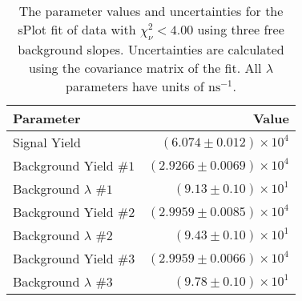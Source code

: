 
\begin{table}[ht]
    \begin{center}
        \begin{tabular}{lr}\toprule
            Parameter & Value \\\midrule
            Signal Yield & $(6.074 \pm 0.012) \times 10^{4}$ \\
            Background Yield $\#1$ & $(2.9266 \pm 0.0069) \times 10^{4}$ \\
            Background $\lambda$ $\#1$ & $(9.13 \pm 0.10) \times 10^{1}$ \\
            Background Yield $\#2$ & $(2.9959 \pm 0.0085) \times 10^{4}$ \\
            Background $\lambda$ $\#2$ & $(9.43 \pm 0.10) \times 10^{1}$ \\
            Background Yield $\#3$ & $(2.9959 \pm 0.0066) \times 10^{4}$ \\
            Background $\lambda$ $\#3$ & $(9.78 \pm 0.10) \times 10^{1}$ \\\bottomrule
        \end{tabular}
        \caption{The parameter values and uncertainties for the sPlot fit of data with $\chi^2_\nu < 4.00$ using three free background slopes. Uncertainties are calculated using the covariance matrix of the fit. All $\lambda$ parameters have units of $\si{\nano\second}^{-1}$.}\label{tab:splot-fit-results-chisqdof-4.00-free-3}
    \end{center}
\end{table}
